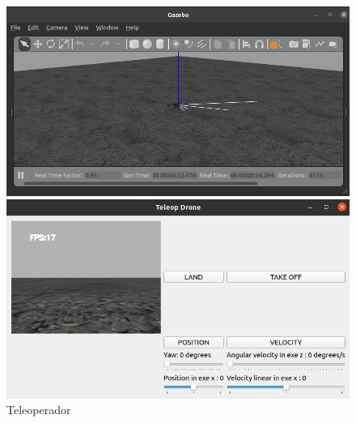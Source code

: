 \begin{appendices}
\begin{figure}[H]
    \centering
    \begin{minipage}{1.0\textwidth}
      \includegraphics[width=\linewidth]{figs/anexo/gazebo.png}
    \end{minipage}
    \begin{minipage}{1.0\textwidth}
      \includegraphics[width=\linewidth]{figs/anexo/interfaz.png}
    \end{minipage}
    \caption{Teleoperador}
    \label{fig:Teleoperador}
    \vspace{-1.5em}
  \end{figure}

\end{appendices}







